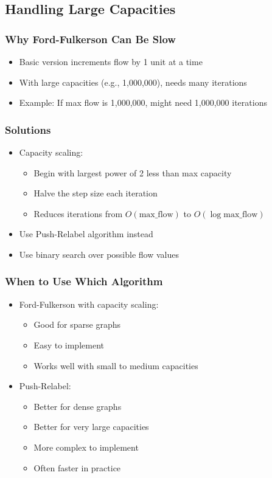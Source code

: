 \documentclass[11pt,a4paper]{article}
\begin{document}
\begin{multicols}{2}
\subsection{Handling Large Capacities}
\subsubsection{Why Ford-Fulkerson Can Be Slow}
\begin{itemize}
    \item Basic version increments flow by 1 unit at a time
    \item With large capacities (e.g., 1,000,000), needs many iterations
    \item Example: If max flow is 1,000,000, might need 1,000,000 iterations
\end{itemize}

\subsubsection{Solutions}
\begin{itemize}
    \item Capacity scaling:
    \begin{itemize}
        \item Begin with largest power of 2 less than max capacity
        \item Halve the step size each iteration
        \item Reduces iterations from $O(\text{max\_flow})$ to $O(\log \text{max\_flow})$
    \end{itemize}
    \item Use Push-Relabel algorithm instead
    \item Use binary search over possible flow values
\end{itemize}

\subsubsection{When to Use Which Algorithm}
\begin{itemize}
    \item Ford-Fulkerson with capacity scaling:
    \begin{itemize}
        \item Good for sparse graphs
        \item Easy to implement
        \item Works well with small to medium capacities
    \end{itemize}
    \item Push-Relabel:
    \begin{itemize}
        \item Better for dense graphs
        \item Better for very large capacities
        \item More complex to implement
        \item Often faster in practice
    \end{itemize}
\end{itemize}


\end{multicols}
\end{document}
